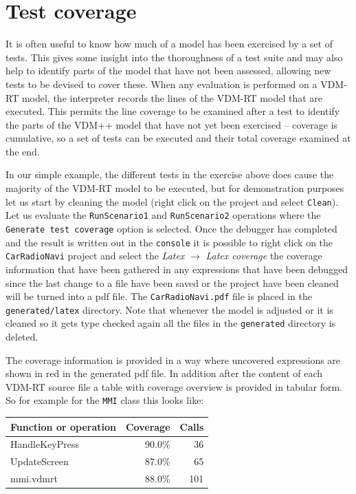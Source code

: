 \section{Test coverage}\label{sec:testcov}

It is often useful to know how much of a model has been exercised by a
set of tests. This gives some insight into the thoroughness of a test
suite and may also help to identify parts of the model that have not
been assessed, allowing new tests to be devised to cover these. When
any evaluation is performed on a VDM-RT model, the interpreter records
the lines of the VDM-RT model that are executed. This permits the line
coverage to be examined after a test to identify the parts of the
VDM++ model that have not yet been exercised -- coverage is
cumulative, so a set of tests can be executed and their total coverage
examined at the end.

In our simple example, the different tests in the exercise above does
cause the majority of the VDM-RT model to be executed, but for
demonstration purposes let us start by cleaning the model (right click
on the project and select \texttt{Clean}). Let us evaluate the
\texttt{RunScenario1} and \texttt{RunScenario2} operations where the
\texttt{Generate test coverage} option is selected.  Once the debugger
has completed and the result is written out in the \texttt{console} it
is possible to right click on the \texttt{CarRadioNavi} project and
select the \emph{Latex} $ \rightarrow $ \emph{Latex coverage} the
coverage information that have been gathered in any expressions that
have been debugged since the last change to a file have been saved or
the project have been cleaned will be turned into a pdf file. The
\texttt{CarRadioNavi.pdf} file is placed in the
\texttt{generated/latex} directory. Note that whenever the model is
adjusted or it is cleaned so it gets type checked again all the files
in the \texttt{generated} directory is deleted.

The coverage information is provided in a way where uncovered
expressions are shown in red in the generated pdf file. In addition
after the content of each VDM-RT source file a table with coverage
overview is provided in tabular form. So for example for the
\texttt{MMI} class this looks like:

\begin{longtable}{|l|r|r|}
\hline
Function or operation & Coverage & Calls \\
\hline
\hline
HandleKeyPress & 90.0\% & 36 \\
\hline
UpdateScreen & 87.0\% & 65 \\
\hline
\hline
mmi.vdmrt & 88.0\% & 101 \\
\hline
\end{longtable}

